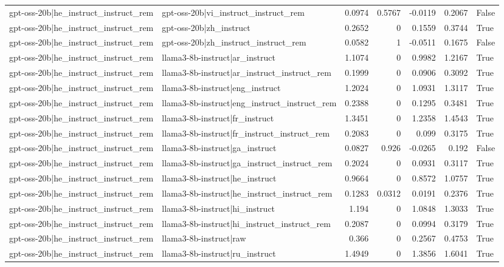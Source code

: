 \begin{table}
\begin{tabular}{l l r r r r l}
gpt-oss-20b|he_instruct_instruct_rem & gpt-oss-20b|vi_instruct_instruct_rem & 0.0974 & 0.5767 & -0.0119 & 0.2067 & False \\
gpt-oss-20b|he_instruct_instruct_rem & gpt-oss-20b|zh_instruct & 0.2652 & 0 & 0.1559 & 0.3744 & True \\
gpt-oss-20b|he_instruct_instruct_rem & gpt-oss-20b|zh_instruct_instruct_rem & 0.0582 & 1 & -0.0511 & 0.1675 & False \\
gpt-oss-20b|he_instruct_instruct_rem & llama3-8b-instruct|ar_instruct & 1.1074 & 0 & 0.9982 & 1.2167 & True \\
gpt-oss-20b|he_instruct_instruct_rem & llama3-8b-instruct|ar_instruct_instruct_rem & 0.1999 & 0 & 0.0906 & 0.3092 & True \\
gpt-oss-20b|he_instruct_instruct_rem & llama3-8b-instruct|eng_instruct & 1.2024 & 0 & 1.0931 & 1.3117 & True \\
gpt-oss-20b|he_instruct_instruct_rem & llama3-8b-instruct|eng_instruct_instruct_rem & 0.2388 & 0 & 0.1295 & 0.3481 & True \\
gpt-oss-20b|he_instruct_instruct_rem & llama3-8b-instruct|fr_instruct & 1.3451 & 0 & 1.2358 & 1.4543 & True \\
gpt-oss-20b|he_instruct_instruct_rem & llama3-8b-instruct|fr_instruct_instruct_rem & 0.2083 & 0 & 0.099 & 0.3175 & True \\
gpt-oss-20b|he_instruct_instruct_rem & llama3-8b-instruct|ga_instruct & 0.0827 & 0.926 & -0.0265 & 0.192 & False \\
gpt-oss-20b|he_instruct_instruct_rem & llama3-8b-instruct|ga_instruct_instruct_rem & 0.2024 & 0 & 0.0931 & 0.3117 & True \\
gpt-oss-20b|he_instruct_instruct_rem & llama3-8b-instruct|he_instruct & 0.9664 & 0 & 0.8572 & 1.0757 & True \\
gpt-oss-20b|he_instruct_instruct_rem & llama3-8b-instruct|he_instruct_instruct_rem & 0.1283 & 0.0312 & 0.0191 & 0.2376 & True \\
gpt-oss-20b|he_instruct_instruct_rem & llama3-8b-instruct|hi_instruct & 1.194 & 0 & 1.0848 & 1.3033 & True \\
gpt-oss-20b|he_instruct_instruct_rem & llama3-8b-instruct|hi_instruct_instruct_rem & 0.2087 & 0 & 0.0994 & 0.3179 & True \\
gpt-oss-20b|he_instruct_instruct_rem & llama3-8b-instruct|raw & 0.366 & 0 & 0.2567 & 0.4753 & True \\
gpt-oss-20b|he_instruct_instruct_rem & llama3-8b-instruct|ru_instruct & 1.4949 & 0 & 1.3856 & 1.6041 & True \\

\end{tabular}
\end{table}
